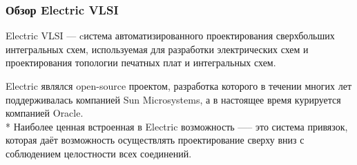 \subsubsection{Обзор Electric VLSI}
\begin{par}
Electric VLSI --- cистема автоматизированного проектирования сверхбольших интегральных схем, используемая для разработки электрических схем и проектирования
топологии печатных плат и интегральных схем.
\end{par}
\begin{par}
Electric являлся open-source проектом, разработка
которого в течении многих лет поддерживалась\cite{electric} компанией Sun Microsystems,
а в настоящее время курируется компанией Oracle. \\*
Наиболее ценная встроенная в Electric возможность —-- это система привязок,
которая даёт возможность осуществлять проектирование сверху вниз с соблюдением целостности
всех соединений.
\end{par}

